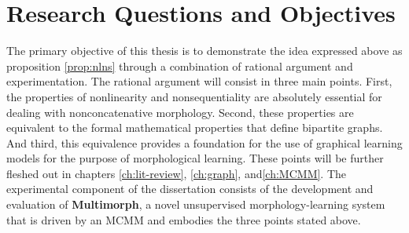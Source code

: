 \section{Research Questions and Objectives}
The primary objective of this thesis is to demonstrate the idea expressed above as proposition \ref{prop:nlns} through a combination of rational argument and experimentation.
The rational argument will consist in three main points.
First, the properties of nonlinearity and nonsequentiality are absolutely essential for dealing with nonconcatenative morphology.
Second, these properties are equivalent to the formal mathematical properties that define bipartite graphs. And third, this equivalence provides a foundation for the use of graphical learning models for the purpose of morphological learning. 
These points will be further fleshed out in chapters \ref{ch:lit-review}, \ref{ch:graph}, and\ref{ch:MCMM}. 
The experimental component of the dissertation consists of the development and evaluation of
 \textbf{Multimorph}, a novel unsupervised morphology-learning system that is driven by an MCMM and embodies the three points stated above.
	
